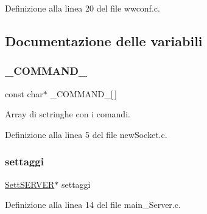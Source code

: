 Definizione alla linea 20 del file wwconf.\+c.



\subsection{Documentazione delle variabili}
\mbox{\label{a00050_ad7ed85b86ff98d7a5853304284acd79e}} 
\subsubsection{\texorpdfstring{\_COMMAND\_}{\_COMMAND\_}}
{\footnotesize\ttfamily const char$\ast$ \+\_\+\+C\+O\+M\+M\+A\+N\+D\+\_\+\mbox{[}$\,$\mbox{]}}



Array di sctringhe con i comandi. 



Definizione alla linea 5 del file new\+Socket.\+c.

\mbox{\label{a00050_a9ea2d4cbc5355102c58960d512b000fc}} 
\subsubsection{\texorpdfstring{settaggi}{settaggi}}
{\footnotesize\ttfamily \mbox{\hyperlink{a00050_a2ae1b7622ac02fc56c93b1f3911fbd76}{Sett\+S\+E\+R\+V\+ER}}$\ast$ settaggi}



Definizione alla linea 14 del file main\+\_\+\+Server.\+c.

